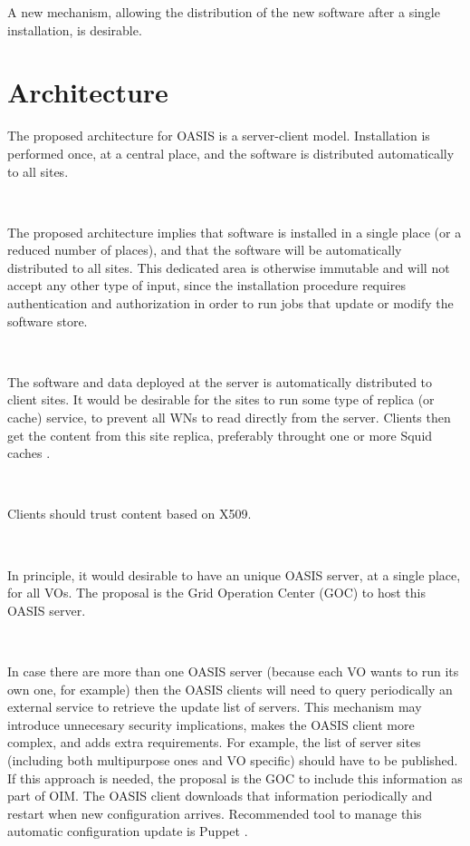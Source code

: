 \documentclass{article}
\begin{document}
A new mechanism, allowing the distribution of the new software after a single
installation, is desirable.

\section{Architecture}

The proposed architecture for OASIS is a server-client model. 
Installation is performed once, at a central place, 
and the software is distributed automatically to all sites. 

~

The proposed architecture implies that software is installed in a single place
(or a reduced number of places), 
and that the software will be automatically distributed to all sites. 
This dedicated area is otherwise immutable and 
will not accept any other type of input, 
since the installation procedure requires authentication and authorization 
in order to run jobs that update or modify the software store.

~

The software and data deployed at the server is automatically distributed to client sites. 
It would be desirable for the sites to run some type of replica (or cache) service, 
to prevent all WNs to read directly from the server.
Clients then get the content from this site replica, preferably throught one or more Squid caches \cite{squid}.

~

Clients should trust content based on X509.

~

In principle, it would desirable to have an unique OASIS server, at a single place, for all VOs. 
The proposal is the Grid Operation Center (GOC) to host this OASIS server.

~

In case there are more than one OASIS server 
(because each VO wants to run its own one, for example)
then the OASIS clients will need to query periodically an external service to 
retrieve the update list of servers.
This mechanism may introduce unnecesary security implications, 
makes the OASIS client more complex, 
and adds extra requirements. 
For example, the list of server sites 
(including both multipurpose ones and VO specific) should have to be published. 
If this approach is needed, the proposal is the GOC to include this information as part of OIM.
The OASIS client downloads that information periodically
and restart when new configuration arrives. 
Recommended tool to manage this automatic configuration update is Puppet \cite{puppet}. 
\end{document}
